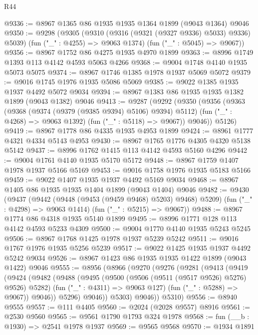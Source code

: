 \begin{lexlean}{R44}
\begin{coremodule}
@9336 := @8967 @1365 @86 @1935 @1935 @1364 @1899 (@9043 @1364) @9046
@9350 := @9298
    (@9305
      (@9310 (@9316 (@9321 (@9327 @9336) @5033) @9336) @5039)
      (fun ("_" : @4255) => @9063 @1374)
      (fun ("_" : @5045) => @9067))
@9356 := @8967 @1752 @86 @4275 @1935 @4970 @1899
@9363 := @8996 @1749 @1393 @113 @4142 @4593 @5063 @4266
@9368 := @9004 @1748 @4140 @1935 @5073 @5075
@9374 := @8967 @1746 @1385 @1978 @1937 @5069 @5072
@9379 := @9016 @1745 @1976 @1935 @5086 @5069
@9385 := @9022 @1385 @1935 @1937 @4492 @5072 @9034
@9394 := @8967 @1383 @86 @1935 @1935 @1382 @1899 (@9043 @1382) @9046
@9413 := @9287
    (@9292
      (@9350
        (@9356
          (@9363
            (@9368 (@9374 (@9379 (@9385 @9394) @5106) @9394) @5112)
            (fun ("_" : @4268) => @9063 @1392)
            (fun ("_" : @5118) => @9067))
          @9046))
      @5126)
@9419 := @8967 @1778 @86 @4335 @1935 @4953 @1899
@9424 := @8961 @1777 @4321 @4334 @5143 @4953
@9430 := @8967 @1765 @1776 @4305 @4320 @5138 @5142
@9437 := @8996 @1762 @1415 @113 @4142 @4593 @5160 @4296
@9442 := @9004 @1761 @4140 @1935 @5170 @5172
@9448 := @8967 @1759 @1407 @1978 @1937 @5166 @5169
@9453 := @9016 @1758 @1976 @1935 @5183 @5166
@9459 := @9022 @1407 @1935 @1937 @4492 @5169 @9034
@9468 := @8967 @1405 @86 @1935 @1935 @1404 @1899 (@9043 @1404) @9046
@9482 := @9430
    (@9437
      (@9442 (@9448 (@9453 (@9459 @9468) @5203) @9468) @5209)
      (fun ("_" : @4298) => @9063 @1414)
      (fun ("_" : @5215) => @9067))
@9488 := @8967 @1774 @86 @4318 @1935 @5140 @1899
@9495 := @8996 @1771 @128 @113 @4142 @4593 @5233 @4309
@9500 := @9004 @1770 @4140 @1935 @5243 @5245
@9506 := @8967 @1768 @1425 @1978 @1937 @5239 @5242
@9511 := @9016 @1767 @1976 @1935 @5256 @5239
@9517 := @9022 @1425 @1935 @1937 @4492 @5242 @9034
@9526 := @8967 @1423 @86 @1935 @1935 @1422 @1899 (@9043 @1422) @9046
@9555 := @8956
    (@8966
      (@9270
        (@9276
          (@9281
            (@9413
              (@9419
                (@9424
                  (@9482
                    (@9488
                      (@9495
                        (@9500 (@9506 (@9511 (@9517 @9526) @5276) @9526) @5282)
                        (fun ("_" : @4311) => @9063 @127)
                        (fun ("_" : @5288) => @9067))
                      @9046))
                  @5296)
                @9046))
            @5303)
          @9046))
      @5310)
@9556 := @8940 @9555
@9557 := @111 @4405
@9560 := @2024 (@2028 @9557) @8916
@9561 := @2530 @9560
@9565 := @9561 @1790 @1793 @324 @1978
@9568 := fun (__b : @1930) => @2541 @1978 @1937
@9569 := @9565 @9568
@9570 := @1934 @1891

\end{coremodule}
\end{lexlean}
